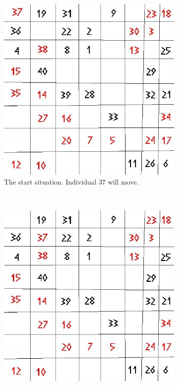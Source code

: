 \begin{figure}[H]
    \centering
    \begin{subfigure}{0.3\textwidth}
        \includegraphics[width=\textwidth]{Tegenvoorbeeld/segregation_tegenvb.jpg}
        \caption{The start situation. Individual $37$ will move.}
        \label{fig:movement1}
    \end{subfigure}\hspace{1cm}
    ~ %
    \begin{subfigure}{0.3\textwidth}
        \includegraphics[width=\textwidth]{Tegenvoorbeeld/segregation_tegenvb_1.jpg}

\end{subfigure}
\end{figure}
